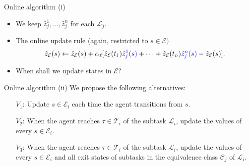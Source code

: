\documentclass{beamer}
\theoremstyle{mystyle}
\newcommand{\cC}{\mathcal{C}}
\newcommand{\cE}{\mathcal{E}}
\newcommand{\cL}{\mathcal{L}}
\newcommand{\cR}{\mathcal{R}}
\newcommand{\cT}{\mathcal{T}}
\begin{document}
%
%
%
%
%
%
%    

\begin{frame}{Online algorithm (i)}

    \begin{itemize}

        \item We keep $\hat{z}_j^1,\ldots,\hat{z}_j^n$ for each $\cL_j$.
        \item The online update rule (again, restricted to $s \in \cE)$
              \[
                  \hat{z}_\cE(s) \leftarrow \hat{z}_\cE(s) + \alpha_\ell [\hat{z}_\cE(t_1) {\color{blue}\hat{z}_j^1(s)} + \cdots + \hat{z}_\cE(t_n) {\color{blue} \hat{z}_j^n(s)}  - \hat{z}_\cE(s)].
              \]
        \item When shall we update states in $\cE$?
    \end{itemize}

\end{frame}


\begin{frame}{Online algorithm (ii)}
    We propose the following alternatives:
    \begin{itemize}
        \item[$V_1$:] Update $s\in\cE_i$ each time the agent transitions from $s$.
        \item[$V_2$:] When the agent reaches $\tau \in \cT_i$ of the subtask $\cL_i$, update the values of every $s \in \cE_i$.
        \item[$V_3$:] When the agent reaches $\tau \in \cT_i$ of the subtask $\cL_i$, update the values of every $s \in \cE_i$ and all exit states of subtasks in the equivalence class $\cC_j$ of $\cL_i$.
    \end{itemize}



\end{frame}
\end{document}
